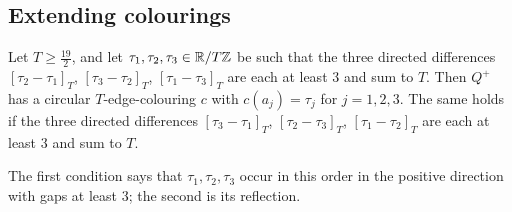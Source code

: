 \documentclass[11pt,colorlinks]{charlie}
\newcommand{\dir}[2]{[#2-#1]}
\begin{document}
\subsection{Extending colourings}

\begin{lemma}\label{lem:extend}
Let $T\ge\frac{19}{2}$, and let $\tau_1,\tau_2,\tau_3\in\mathbb{R}/T\mathbb{Z}$ be such that the three directed differences $\dir{\tau_1}{\tau_2}_T$, $\dir{\tau_2}{\tau_3}_T$, $\dir{\tau_3}{\tau_1}_T$ are each at least $3$ and sum to $T$. Then $Q^+$ has a circular $T$-edge-colouring $c$ with $c(a_j)=\tau_j$ for $j=1,2,3$. The same holds if the three directed differences $\dir{\tau_1}{\tau_3}_T$, $\dir{\tau_3}{\tau_2}_T$, $\dir{\tau_2}{\tau_1}_T$ are each at least $3$ and sum to $T$.
\end{lemma}

The first condition says that $\tau_1,\tau_2,\tau_3$ occur in this order in the positive direction with gaps at least $3$; the second is its reflection.
\end{document}
